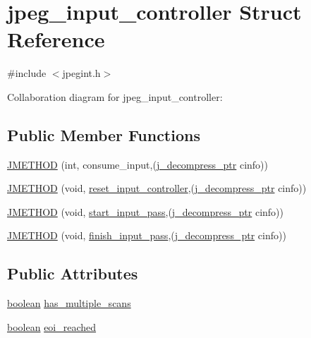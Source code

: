 \hypertarget{structjpeg__input__controller}{}\section{jpeg\+\_\+input\+\_\+controller Struct Reference}
\label{structjpeg__input__controller}


{\ttfamily \#include $<$jpegint.\+h$>$}



Collaboration diagram for jpeg\+\_\+input\+\_\+controller\+:
\subsection*{Public Member Functions}
\begin{DoxyCompactItemize}
\item 
\mbox{\hyperlink{structjpeg__input__controller_af742c796479db5dd8b3275307d76a103}{J\+M\+E\+T\+H\+OD}} (int, consume\+\_\+input,(\mbox{\hyperlink{jpeglib_8h_a00c7d78af44bd26a901c791ccfc1e178}{j\+\_\+decompress\+\_\+ptr}} cinfo))
\item 
\mbox{\hyperlink{structjpeg__input__controller_aa2720adb6f991abedb2e8c03804cac4f}{J\+M\+E\+T\+H\+OD}} (void, \mbox{\hyperlink{jdinput_8c_a93f58ee9099d00fef5d7e3891aa9e54f}{reset\+\_\+input\+\_\+controller}},(\mbox{\hyperlink{jpeglib_8h_a00c7d78af44bd26a901c791ccfc1e178}{j\+\_\+decompress\+\_\+ptr}} cinfo))
\item 
\mbox{\hyperlink{structjpeg__input__controller_aef985c09924396a078c67592da47d679}{J\+M\+E\+T\+H\+OD}} (void, \mbox{\hyperlink{jdinput_8c_abc0a94e24edf93bc7f914cf4a698a870}{start\+\_\+input\+\_\+pass}},(\mbox{\hyperlink{jpeglib_8h_a00c7d78af44bd26a901c791ccfc1e178}{j\+\_\+decompress\+\_\+ptr}} cinfo))
\item 
\mbox{\hyperlink{structjpeg__input__controller_a70620c8e0ea8fd2f7b0243cd9bf395e1}{J\+M\+E\+T\+H\+OD}} (void, \mbox{\hyperlink{jdinput_8c_a9777f7fabb58d9a42f34510bf0a71d1c}{finish\+\_\+input\+\_\+pass}},(\mbox{\hyperlink{jpeglib_8h_a00c7d78af44bd26a901c791ccfc1e178}{j\+\_\+decompress\+\_\+ptr}} cinfo))
\end{DoxyCompactItemize}
\subsection*{Public Attributes}
\begin{DoxyCompactItemize}
\item 
\mbox{\hyperlink{jmorecfg_8h_a7c6368b321bd9acd0149b030bb8275ed}{boolean}} \mbox{\hyperlink{structjpeg__input__controller_a6f02f9c18464bfbf30b27f5a43c2665a}{has\+\_\+multiple\+\_\+scans}}
\item 
\mbox{\hyperlink{jmorecfg_8h_a7c6368b321bd9acd0149b030bb8275ed}{boolean}} \mbox{\hyperlink{structjpeg__input__controller_a8e1c345f356d36f98c2ece4dc21549d7}{eoi\+\_\+reached}}
\end{DoxyCompactItemize}


